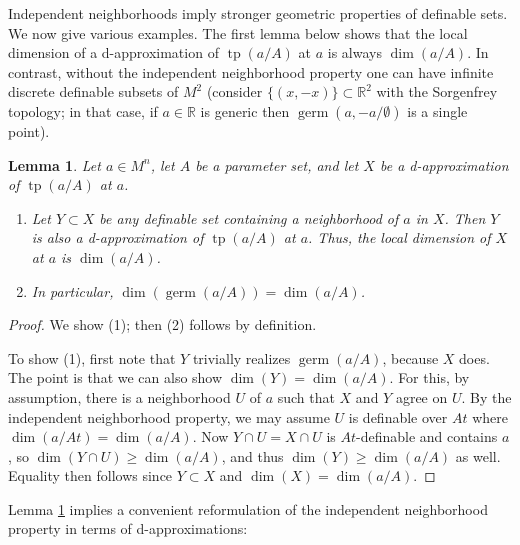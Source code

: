 \documentclass{amsart}
\newtheorem{lemma}[theorem]{Lemma}
\theoremstyle{definition}
\newcommand{\tp}{\operatorname{tp}}
\begin{document}
Independent neighborhoods imply stronger geometric properties of definable sets. We now give various examples. The first lemma below shows that the local dimension of a d-approximation of $\tp(a/A)$ at $a$ is always $\dim(a/A)$. In contrast, without the independent neighborhood property one can have infinite discrete definable subsets of $M^2$ (consider $\{(x,-x)\}\subset\mathbb R^2$ with the Sorgenfrey topology; in that case, if $a\in\mathbb R$ is generic then $\operatorname{germ}(a,-a/\emptyset)$ is a single point).

\begin{lemma}\label{L: local dimension}
    Let $a\in M^n$, let $A$ be a parameter set, and let $X$ be a d-approximation of $\tp(a/A)$ at $a$.
    \begin{enumerate}
        \item Let $Y\subset X$ be any definable set containing a neighborhood of $a$ in $X$. Then $Y$ is also a d-approximation of $\tp(a/A)$ at $a$. Thus, the local dimension of $X$ at $a$ is $\dim(a/A)$.
        \item In particular, $\dim(\operatorname{germ}(a/A))=\dim(a/A)$.
    \end{enumerate}
        \end{lemma}
\begin{proof}
    We show (1); then (2) follows by definition.
    
    To show (1), first note that $Y$ trivially realizes $\operatorname{germ}(a/A)$, because $X$ does. The point is that we can also show $\dim(Y)=\dim(a/A)$. For this, by assumption, there is a neighborhood $U$ of $a$ such that $X$ and $Y$ agree on $U$. By the independent neighborhood property, we may assume $U$ is definable over $At$ where $\dim(a/At)=\dim(a/A)$. Now $Y\cap U=X\cap U$ is $At$-definable and contains $a$, so $\dim(Y\cap U)\geq\dim(a/A)$, and thus $\dim(Y)\geq\dim(a/A)$ as well. Equality then follows since $Y\subset X$ and $\dim(X)=\dim(a/A)$. 
\end{proof}

Lemma \ref{L: local dimension} implies a convenient reformulation of the independent neighborhood property in terms of d-approximations:
\end{document}
